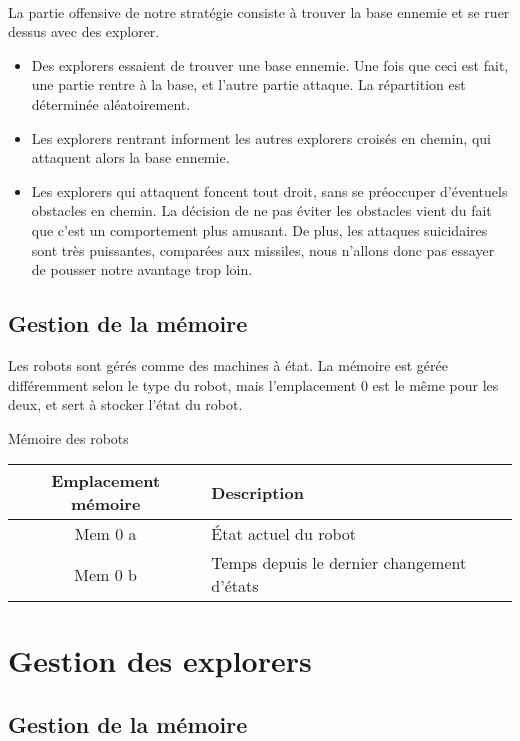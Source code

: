 \documentclass{article}
\begin{document}
\paragraph{}
La partie offensive de notre stratégie consiste à trouver la base ennemie et se ruer dessus avec des explorer.
\begin{itemize}
	\item Des explorers essaient de trouver une base ennemie. Une fois que ceci est fait, une partie rentre à la base, et l'autre partie attaque. La répartition est déterminée aléatoirement.
        \item Les explorers rentrant informent les autres explorers croisés en chemin, qui attaquent alors la base ennemie.
        \item Les explorers qui attaquent foncent tout droit, sans se préoccuper d'éventuels obstacles en chemin.
            La décision de ne pas éviter les obstacles vient du fait que c'est un comportement plus amusant.
            De plus, les attaques suicidaires sont très puissantes, comparées aux missiles, nous n'allons donc pas essayer de pousser notre avantage trop loin.
\end{itemize}

\subsection{Gestion de la mémoire}

Les robots sont gérés comme des machines à état.
La mémoire est gérée différemment selon le type du robot, mais l'emplacement 0 est le même pour les deux, et sert à stocker l'état du robot.

\begin{table}[!htb]
	Mémoire des robots\\
	\begin{tabular}{|c|l|}
		\hline
		Emplacement mémoire & Description\\
		\hline
		Mem 0 a & État actuel du robot\\
		Mem 0 b & Temps depuis le dernier changement d'états\\
		\hline
	\end{tabular}
\end{table}

\section{Gestion des explorers}

\subsection{Gestion de la mémoire}
\end{document}
